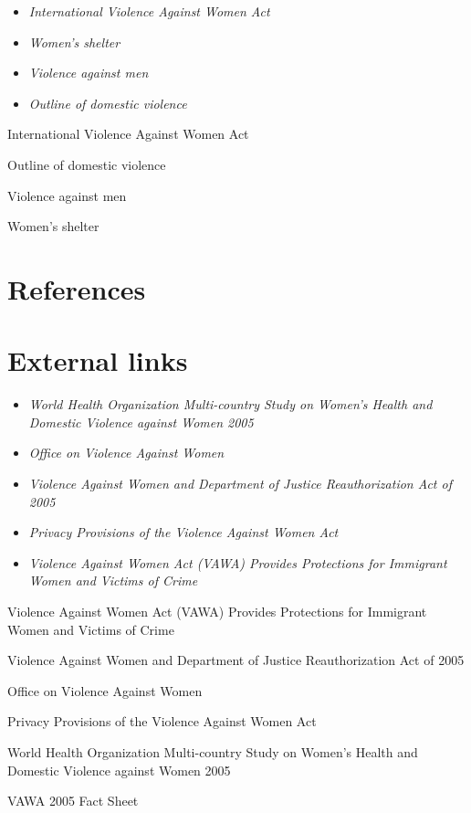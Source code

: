\begin{itemize}
\item
  \emph{International Violence Against Women Act}
\item
  \emph{Women's shelter}
\item
  \emph{Violence against men}
\item
  \emph{Outline of domestic violence}
\end{itemize}

International Violence Against Women Act

Outline of domestic violence

Violence against men

Women's shelter

\section{References}\label{references}

\section{External links}\label{external-links}

\begin{itemize}
\item
  \emph{World Health Organization Multi-country Study on Women's Health
  and Domestic Violence against Women 2005}
\item
  \emph{Office on Violence Against Women}
\item
  \emph{Violence Against Women and Department of Justice Reauthorization
  Act of 2005}
\item
  \emph{Privacy Provisions of the Violence Against Women Act}
\item
  \emph{Violence Against Women Act (VAWA) Provides Protections for
  Immigrant Women and Victims of Crime}
\end{itemize}

Violence Against Women Act (VAWA) Provides Protections for Immigrant
Women and Victims of Crime

Violence Against Women and Department of Justice Reauthorization Act of
2005

Office on Violence Against Women

Privacy Provisions of the Violence Against Women Act

World Health Organization Multi-country Study on Women's Health and
Domestic Violence against Women 2005

VAWA 2005 Fact Sheet
